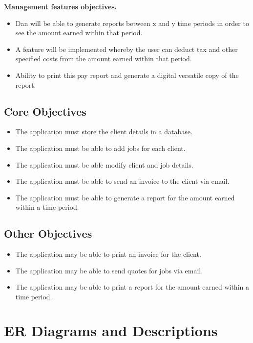	\textbf{Management features objectives.}
	
		\begin{itemize}
			\item Dan will be able to generate reports between x and y time periods in order to see the amount earned within that period.
			\item A feature will be implemented whereby the user can deduct tax and other specified costs from the amount earned within that period.
			\item Ability to print this pay report and generate a digital versatile copy of the report.
		\end{itemize}	


\subsection{Core Objectives}
	
	\begin{itemize}
		\item The application must store the client details in a database.
		\item The application must be able to add jobs for each client.
		\item The application must be able  modify client and job details.
		\item The application must be able to send an invoice to the client via email.
		\item The application must be able to generate a report for the amount earned within a time period.
	\end{itemize}


\subsection{Other Objectives}

	\begin{itemize}
		\item The application may be able to print an invoice for the client.
		\item The application may be able to send quotes for jobs via email.
		\item The application may be able to print a report for the amount earned within a time period.
	\end{itemize}
\section{ER Diagrams and Descriptions}

